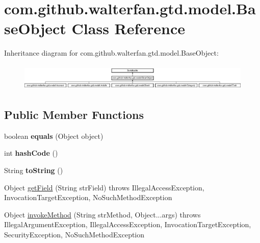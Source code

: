 \hypertarget{classcom_1_1github_1_1walterfan_1_1gtd_1_1model_1_1BaseObject}{\section{com.\-github.\-walterfan.\-gtd.\-model.\-Base\-Object Class Reference}
\label{classcom_1_1github_1_1walterfan_1_1gtd_1_1model_1_1BaseObject}
}
Inheritance diagram for com.\-github.\-walterfan.\-gtd.\-model.\-Base\-Object\-:\begin{figure}[H]
\begin{center}
\leavevmode
\includegraphics[height=1.272727cm]{classcom_1_1github_1_1walterfan_1_1gtd_1_1model_1_1BaseObject}
\end{center}
\end{figure}
\subsection*{Public Member Functions}
\begin{DoxyCompactItemize}
\item 
\hypertarget{classcom_1_1github_1_1walterfan_1_1gtd_1_1model_1_1BaseObject_af80a9f5d03ffbb1e2ad776b9d603401f}{boolean {\bfseries equals} (Object object)}\label{classcom_1_1github_1_1walterfan_1_1gtd_1_1model_1_1BaseObject_af80a9f5d03ffbb1e2ad776b9d603401f}

\item 
\hypertarget{classcom_1_1github_1_1walterfan_1_1gtd_1_1model_1_1BaseObject_a60edd102d3719adbe033d35402dc509c}{int {\bfseries hash\-Code} ()}\label{classcom_1_1github_1_1walterfan_1_1gtd_1_1model_1_1BaseObject_a60edd102d3719adbe033d35402dc509c}

\item 
\hypertarget{classcom_1_1github_1_1walterfan_1_1gtd_1_1model_1_1BaseObject_ab85b68e5efdce320dc5b1184d3d28d3c}{String {\bfseries to\-String} ()}\label{classcom_1_1github_1_1walterfan_1_1gtd_1_1model_1_1BaseObject_ab85b68e5efdce320dc5b1184d3d28d3c}

\item 
Object \hyperlink{classcom_1_1github_1_1walterfan_1_1gtd_1_1model_1_1BaseObject_aa9c242e5a1ff02058e26ddf277f56127}{get\-Field} (String str\-Field)  throws Illegal\-Access\-Exception,             Invocation\-Target\-Exception, No\-Such\-Method\-Exception 
\item 
Object \hyperlink{classcom_1_1github_1_1walterfan_1_1gtd_1_1model_1_1BaseObject_afa45970ded68ada4994d0a004c41275a}{invoke\-Method} (String str\-Method, Object...\-args)  throws Illegal\-Argument\-Exception, Illegal\-Access\-Exception,             Invocation\-Target\-Exception, Security\-Exception, No\-Such\-Method\-Exception 
\end{DoxyCompactItemize}
